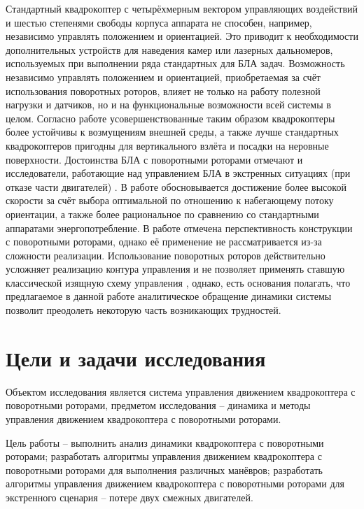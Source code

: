 Стандартный квадрокоптер с четырёхмерным вектором управляющих воздействий и шестью степенями свободы корпуса аппарата не способен, например, независимо управлять положением и ориентацией.
Это приводит к необходимости дополнительных устройств для наведения камер или лазерных дальномеров, используемых при выполнении ряда стандартных для БЛА задач.
Возможность независимо управлять положением и ориентацией, приобретаемая за счёт использования поворотных роторов, влияет не только на работу полезной нагрузки и датчиков, но и на функциональные возможности всей системы в целом.
Согласно работе \cite{Stolc01} усовершенствованные таким образом квадрокоптеры более устойчивы к возмущениям внешней среды, а также лучше стандартных квадрокоптеров пригодны для вертикального взлёта и посадки на неровные поверхности.
Достоинства БЛА с поворотными роторами отмечают и исследователи, работающие над управлением БЛА в экстренных ситуациях (при отказе части двигателей) \cite{Morozov01, Shidar00}.
В работе \cite{Shidar00} обосновывается достижение более высокой скорости за счёт выбора оптимальной по отношению к набегающему потоку ориентации, а также более рациональное по сравнению со стандартными аппаратами энергопотребление.
В работе \cite{Morozov01} отмечена перспективность конструкции с поворотными роторами, однако её применение не рассматривается из-за сложности реализации.
Использование поворотных роторов действительно усложняет реализацию контура управления \cite{Ryll01, Falconi01, Segui01, Oosedo01} и не позволяет применять ставшую классической изящную схему управления \cite{Mellinger01}, однако, есть основания полагать, что предлагаемое в данной работе аналитическое обращение динамики системы позволит преодолеть некоторую часть возникающих трудностей.

\section{Цели и задачи исследования}

Объектом исследования является система управления движением квадрокоптера с поворотными роторами, предметом исследования -- динамика и методы управления движением квадрокоптера с поворотными роторами.

Цель работы -- выполнить анализ динамики квадрокоптера с поворотными роторами;
разработать алгоритмы управления движением квадрокоптера с поворотными роторами для выполнения различных манёвров; разработать алгоритмы управления движением квадрокоптера с поворотными роторами для экстренного сценария -- потере двух смежных двигателей.

